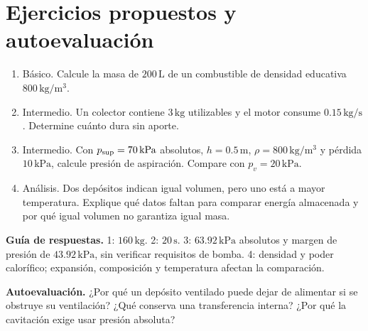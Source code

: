 \section{Ejercicios propuestos y autoevaluación}
\begin{enumerate}
\item Básico. Calcule la masa de $200\,\mathrm{L}$ de un combustible de densidad educativa $800\,\mathrm{kg/m^3}$.
\item Intermedio. Un colector contiene $3\,\mathrm{kg}$ utilizables y el motor consume $0.15\,\mathrm{kg/s}$. Determine cuánto dura sin aporte.
\item Intermedio. Con $p_{\rm sup}=70\,\mathrm{kPa}$ absolutos, $h=0.5\,\mathrm{m}$, $\rho=800\,\mathrm{kg/m^3}$ y pérdida $10\,\mathrm{kPa}$, calcule presión de aspiración. Compare con $p_v=20\,\mathrm{kPa}$.
\item Análisis. Dos depósitos indican igual volumen, pero uno está a mayor temperatura. Explique qué datos faltan para comparar energía almacenada y por qué igual volumen no garantiza igual masa.
\end{enumerate}
\textbf{Guía de respuestas.} 1: $160\,\mathrm{kg}$. 2: $20\,\mathrm{s}$. 3: $63.92\,\mathrm{kPa}$ absolutos y margen de presión de $43.92\,\mathrm{kPa}$, sin verificar requisitos de bomba. 4: densidad y poder calorífico; expansión, composición y temperatura afectan la comparación.

\textbf{Autoevaluación.} ¿Por qué un depósito ventilado puede dejar de alimentar si se obstruye su ventilación? ¿Qué conserva una transferencia interna? ¿Por qué la cavitación exige usar presión absoluta?
